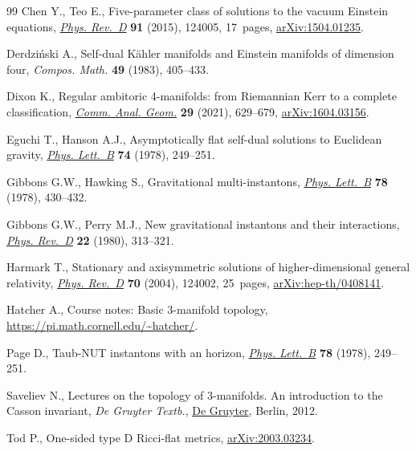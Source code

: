 \documentclass[pdftex]{sigma}
\numberwithin{equation}{section}
\begin{document}
\begin{thebibliography}{99}
Chen Y., Teo E., Five-parameter class of solutions to the vacuum {E}instein
 equations, \href{https://doi.org/10.1103/PhysRevD.91.124005}{\textit{Phys. Rev.~D}} \textbf{91} (2015), 124005, 17~pages,
 \href{https://arxiv.org/abs/1504.01235}{arXiv:1504.01235}.

Derdzi\'nski A., Self-dual {K}\"ahler manifolds and {E}instein manifolds of
 dimension four, \textit{Compos. Math.} \textbf{49} (1983), 405--433.

Dixon K., Regular ambitoric 4-manifolds: from {R}iemannian {K}err to a complete
 classification, \href{https://doi.org/10.4310/CAG.2021.v29.n3.a3}{\textit{Comm. Anal. Geom.}} \textbf{29} (2021), 629--679,
 \href{https://arxiv.org/abs/1604.03156}{arXiv:1604.03156}.

Eguchi T., Hanson A.J., Asymptotically flat self-dual solutions to {E}uclidean
 gravity, \href{https://doi.org/10.1016/0370-2693(78)90566-X}{\textit{Phys. Lett.~B}} \textbf{74} (1978), 249--251.

Gibbons G.W., Hawking S., Gravitational multi-instantons, \href{https://doi.org/10.1016/0370-2693(78)90478-1}{\textit{Phys.
 Lett.~B}} \textbf{78} (1978), 430--432.

Gibbons G.W., Perry M.J., New gravitational instantons and their interactions,
 \href{https://doi.org/10.1103/PhysRevD.22.313}{\textit{Phys. Rev.~D}} \textbf{22} (1980), 313--321.

Harmark T., Stationary and axisymmetric solutions of higher-dimensional general
 relativity, \href{https://doi.org/10.1103/PhysRevD.70.124002}{\textit{Phys. Rev.~D}} \textbf{70} (2004), 124002, 25~pages,
 \href{https://arxiv.org/abs/hep-th/0408141}{arXiv:hep-th/0408141}.

Hatcher A., Course notes: {B}asic 3-manifold topology,
 \url{https://pi.math.cornell.edu/~hatcher/}.

Page D., Taub-{NUT} instantons with an horizon, \href{https://doi.org/10.1016/0370-2693(78)90016-3}{\textit{Phys. Lett.~B}}
 \textbf{78} (1978), 249--251.

Saveliev N., Lectures on the topology of 3-manifolds. {A}n introduction to the
 {C}asson invariant, \textit{{D}e Gruyter Textb.}, \href{https://doi.org/10.1515/9783110250367}{{D}e Gruyter}, Berlin, 2012.

Tod P., One-sided type {D} {R}icci-flat metrics, \href{https://arxiv.org/abs/2003.03234}{arXiv:2003.03234}.

\end{thebibliography}\LastPageEnding
\end{document}
